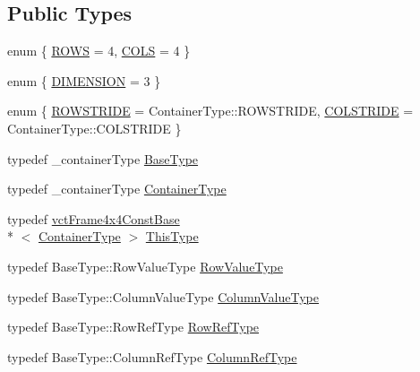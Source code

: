 \subsection*{Public Types}
\begin{DoxyCompactItemize}
\item 
enum \{ \hyperlink{classvct_frame4x4_const_base_a59489f9af452566ab1c64e8bdd773816a0bf380abb894ab8d6cba2c741fdef509}{R\-O\-W\-S} = 4, 
\hyperlink{classvct_frame4x4_const_base_a59489f9af452566ab1c64e8bdd773816a9cb20cd587381139ae46de3761a04fcd}{C\-O\-L\-S} = 4
 \}
\item 
enum \{ \hyperlink{classvct_frame4x4_const_base_aa9000d4539e9ab27b091692d4bd0d986a97d7212e6c46dc9acbbd11bbc573d9a0}{D\-I\-M\-E\-N\-S\-I\-O\-N} = 3
 \}
\item 
enum \{ \hyperlink{classvct_frame4x4_const_base_a42bd2679548bfbb62bdca7f3a84c11fda381a64d4c14fac22ed91dcce4141d39d}{R\-O\-W\-S\-T\-R\-I\-D\-E} = Container\-Type\-:\-:R\-O\-W\-S\-T\-R\-I\-D\-E, 
\hyperlink{classvct_frame4x4_const_base_a42bd2679548bfbb62bdca7f3a84c11fdac3f81140627afba5e58cb14bd1a4e648}{C\-O\-L\-S\-T\-R\-I\-D\-E} = Container\-Type\-:\-:C\-O\-L\-S\-T\-R\-I\-D\-E
 \}
\item 
typedef \-\_\-container\-Type \hyperlink{classvct_frame4x4_const_base_a586ce8ad04a54639cc8967a17fb3cd36}{Base\-Type}
\item 
typedef \-\_\-container\-Type \hyperlink{classvct_frame4x4_const_base_ac8b3e3540ee9e065a519d7b364276662}{Container\-Type}
\item 
typedef \hyperlink{classvct_frame4x4_const_base}{vct\-Frame4x4\-Const\-Base}\\*
$<$ \hyperlink{classvct_frame4x4_const_base_ac8b3e3540ee9e065a519d7b364276662}{Container\-Type} $>$ \hyperlink{classvct_frame4x4_const_base_acb37107e49c20bd15139ff196aff1087}{This\-Type}
\item 
typedef Base\-Type\-::\-Row\-Value\-Type \hyperlink{classvct_frame4x4_const_base_aa63c7449b3c8248ec0d2e852d2389ae9}{Row\-Value\-Type}
\item 
typedef Base\-Type\-::\-Column\-Value\-Type \hyperlink{classvct_frame4x4_const_base_a72db1f941fd40f1252409297c3dd0ff6}{Column\-Value\-Type}
\item 
typedef Base\-Type\-::\-Row\-Ref\-Type \hyperlink{classvct_frame4x4_const_base_a4032e45bc1de2cf3ef9436aef57f1595}{Row\-Ref\-Type}
\item 
typedef Base\-Type\-::\-Column\-Ref\-Type \hyperlink{classvct_frame4x4_const_base_aa62cf0655339f6cbbe4c0b4323fe8dcf}{Column\-Ref\-Type}

\end{DoxyCompactItemize}
